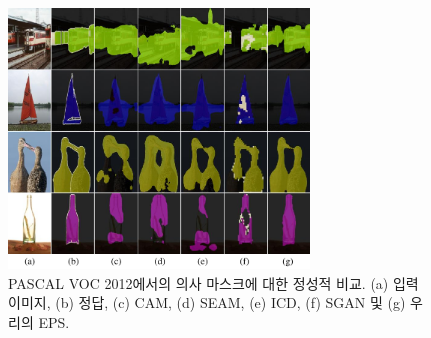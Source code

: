 \begin{figure}[t]
\centering
\includegraphics[width=8cm]{figures/fig_ablation.pdf}
\caption{PASCAL VOC 2012에서의 의사 마스크에 대한 정성적 비교. (a) 입력 이미지, (b) 정답, (c) CAM, (d) SEAM, (e) ICD, (f) SGAN 및 (g) 우리의 EPS.}
\label{fig:ablation} \vspace{-3mm}
\end{figure}
